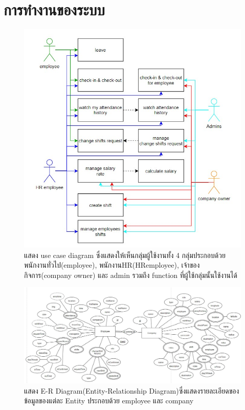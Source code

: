 \section{การทำงานของระบบ}
\begin{figure}
\begin{center}
\includegraphics[width=14cm,keepaspectratio]{./images/usecaseDiagram.jpg}
\end{center}
\caption[Poem]{แสดง use case diagram ซึ่งแสดงให้เห็นกลุ่มผู้ใช้งานทั้ง 4 กลุ่มประกอบด้วย พนักงานทั่วไป(employee), พนักงานHR(HRemployee), เจ้าของกิจการ(company owner) และ admin รวมถึง function ที่ผู้ใช้กลุ่มนั้นใช้งานได้}
\end{figure}

\begin{figure}
\begin{center}
\includegraphics[width=14cm,keepaspectratio]{./images/ERdiagram.jpg}
\end{center}
\caption[Poem]{แสดง E-R Diagram(Entity-Relationship Diagram)ซึ่งแสดงรายละเอียดของข้อมูลของแต่ละ Entity ประกอบด้วย employee และ company}
\end{figure}

